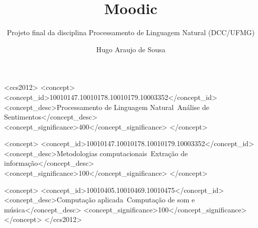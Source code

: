 \documentclass[sigconf]{acmart}
\begin{document}
\title{Moodic}
\subtitle{Projeto final da disciplina Processamento de Linguagem
Natural (DCC/UFMG)}

\author{Hugo Araujo de Sousa}


\begin{abstract}
  
\end{abstract}

%
%
\begin{CCSXML}
<ccs2012>
<concept>
<concept_id>10010147.10010178.10010179.10003352</concept_id>
<concept_desc>Processamento de Linguagem Natural~Análise de Sentimentos</concept_desc>
<concept_significance>400</concept_significance>
</concept>

<concept>
<concept_id>10010147.10010178.10010179.10003352</concept_id>
<concept_desc>Metodologias computacionais~Extração de informação</concept_desc>
<concept_significance>100</concept_significance>
</concept>

<concept>
<concept_id>10010405.10010469.10010475</concept_id>
<concept_desc>Computação aplicada~Computação de som e música</concept_desc>
<concept_significance>100</concept_significance>
</concept>
</ccs2012>
\end{CCSXML}


\maketitle




 
\end{document}
